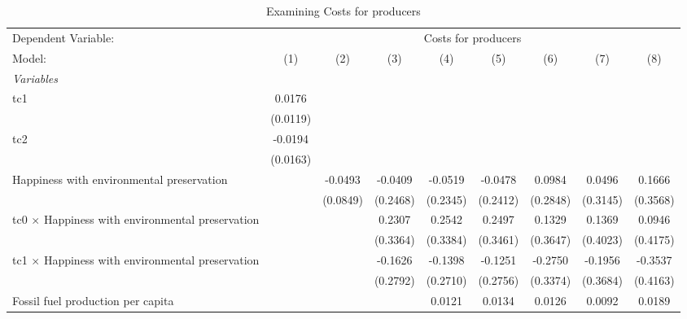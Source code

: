 
\begin{table}[htbp]
   \caption{Examining Costs for producers}
   \centering
   \begin{tabular}{lcccccccc}
      \tabularnewline \midrule \midrule
      Dependent Variable: & \multicolumn{8}{c}{Costs for producers}\\
      Model:                                                  & (1)      & (2)      & (3)      & (4)      & (5)      & (6)      & (7)            & (8)\\  
      \midrule
      \emph{Variables}\\
      tc1                                                     & 0.0176   &          &          &          &          &          &                &   \\   
                                                              & (0.0119) &          &          &          &          &          &                &   \\   
      tc2                                                     & -0.0194  &          &          &          &          &          &                &   \\   
                                                              & (0.0163) &          &          &          &          &          &                &   \\   
      Happiness with environmental preservation               &          & -0.0493  & -0.0409  & -0.0519  & -0.0478  & 0.0984   & 0.0496         & 0.1666\\   
                                                              &          & (0.0849) & (0.2468) & (0.2345) & (0.2412) & (0.2848) & (0.3145)       & (0.3568)\\   
      tc0 $\times$ Happiness with environmental preservation  &          &          & 0.2307   & 0.2542   & 0.2497   & 0.1329   & 0.1369         & 0.0946\\   
                                                              &          &          & (0.3364) & (0.3384) & (0.3461) & (0.3647) & (0.4023)       & (0.4175)\\   
      tc1 $\times$ Happiness with environmental preservation  &          &          & -0.1626  & -0.1398  & -0.1251  & -0.2750  & -0.1956        & -0.3537\\   
                                                              &          &          & (0.2792) & (0.2710) & (0.2756) & (0.3374) & (0.3684)       & (0.4163)\\   
      Fossil fuel production per capita                       &          &          &          & 0.0121   & 0.0134   & 0.0126   & 0.0092         & 0.0189\\   

\end{tabular}
\end{table}
